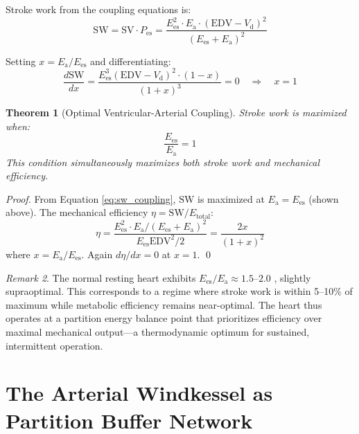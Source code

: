 \documentclass[12pt,a4paper]{article}
\newtheorem{theorem}{Theorem}[section]
\theoremstyle{remark}
\newtheorem{remark}[theorem]{Remark}
\newcommand{\Ees}{E_{\mathrm{es}}}
\newcommand{\Ea}{E_{\mathrm{a}}}
\newcommand{\Vd}{V_{\mathrm{d}}}
\newcommand{\Pes}{P_{\mathrm{es}}}
\newcommand{\SV}{\mathrm{SV}}
\newcommand{\EDV}{\mathrm{EDV}}
\newcommand{\SW}{\mathrm{SW}}
\begin{document}
Stroke work from the coupling equations is:
\begin{equation}
    \SW = \SV \cdot \Pes = \frac{\Ees^2 \cdot \Ea \cdot (\EDV - \Vd)^2}{(\Ees + \Ea)^2}
    \label{eq:sw_coupling}
\end{equation}

Setting $x = \Ea/\Ees$ and differentiating:
\begin{equation}
    \frac{d\SW}{dx} = \frac{\Ees^3(\EDV-\Vd)^2 \cdot (1-x)}{(1+x)^3} = 0 \quad\Rightarrow\quad x = 1
\end{equation}

\begin{theorem}[Optimal Ventricular-Arterial Coupling]
\label{thm:coupling}
    Stroke work is maximized when:
    \begin{equation}
        \boxed{\frac{\Ees}{\Ea} = 1}
        \label{eq:optimal_coupling}
    \end{equation}
    This condition simultaneously maximizes both stroke work and mechanical efficiency.
\end{theorem}

\begin{proof}
    From Equation \ref{eq:sw_coupling}, $\SW$ is maximized at $\Ea = \Ees$ (shown above). The mechanical efficiency $\eta = \SW / E_{\mathrm{total}}$:
    \begin{equation}
        \eta = \frac{\Ees^2 \cdot \Ea / (\Ees + \Ea)^2}{\Ees \EDV^2/2} = \frac{2 x}{(1+x)^2}
    \end{equation}
    where $x = \Ea/\Ees$. Again $d\eta/dx = 0$ at $x = 1$. \qed
\end{proof}

\begin{remark}
    The normal resting heart exhibits $\Ees/\Ea \approx 1.5$--$2.0$ \cite{sunagawa1985ventricular}, slightly supraoptimal. This corresponds to a regime where stroke work is within 5--10\% of maximum while metabolic efficiency remains near-optimal. The heart thus operates at a partition energy balance point that prioritizes efficiency over maximal mechanical output—a thermodynamic optimum for sustained, intermittent operation.
\end{remark}

\section{The Arterial Windkessel as Partition Buffer Network}
\label{sec:windkessel}
\end{document}
